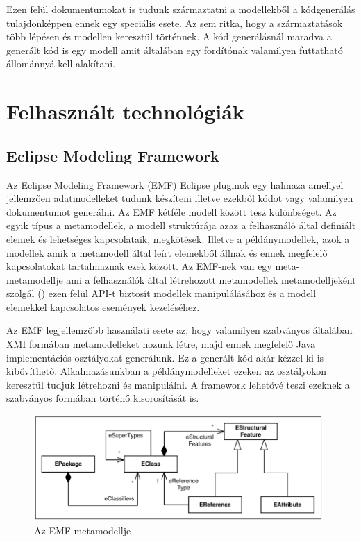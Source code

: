 Ezen felül dokumentumokat is tudunk származtatni a modellekből a kódgenerálás tulajdonképpen ennek egy speciális esete. Az sem ritka, hogy a származtatások több lépésen és modellen keresztül történnek. A kód generálásnál maradva a generált kód is egy modell amit általában egy fordítónak valamilyen futtatható állománnyá kell alakítani.


\section{Felhasznált technológiák}
\subsection{Eclipse Modeling Framework}

Az Eclipse Modeling Framework (EMF) Eclipse pluginok egy halmaza amellyel jellemzően adatmodelleket tudunk készíteni illetve ezekből kódot vagy valamilyen dokumentumot generálni. Az EMF kétféle modell között tesz különbséget. Az egyik típus a metamodellek, a modell struktúrája azaz a felhasználó által definiált elemek és lehetséges kapcsolataik, megkötések. Illetve a példánymodellek, azok a modellek amik a metamodell által leírt elemekből állnak és ennek megfelelő kapcsolatokat tartalmaznak ezek között. Az EMF-nek van egy meta-metamodellje ami a felhasználók által létrehozott metamodellek metamodelljeként szolgál () ezen felül API-t biztosít modellek manipulálásához és a modell elemekkel kapcsolatos események kezeléséhez.

Az EMF legjellemzőbb használati esete az, hogy valamilyen szabványos általában XMI formában metamodelleket hozunk létre, majd ennek megfelelő Java implementációs osztályokat generálunk. Ez a generált kód akár kézzel ki is kibővíthető. Alkalmazásunkban a példánymodelleket ezeken az osztályokon keresztül tudjuk létrehozni és manipulálni. A framework lehetővé teszi ezeknek a szabványos formában történő kisorosítását is.

\begin{figure}[!ht]
	\centering
	\includegraphics[width=110mm, keepaspectratio]{figures/preliminaries/emf-meta.png}
	\caption[]{Az EMF metamodellje}
	\label{fig:emf-meta}
\end{figure}

